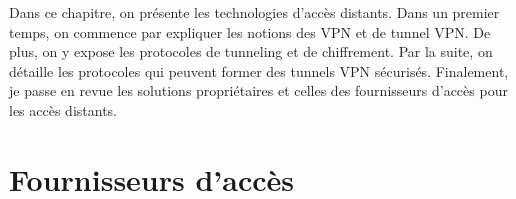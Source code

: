 Dans ce chapitre, on présente les technologies d'accès distants.
Dans un premier temps, on commence par expliquer les notions des VPN et de tunnel VPN. 
De plus, on y expose les protocoles de tunneling et de chiffrement.
Par la suite, on détaille les protocoles qui peuvent former des tunnels VPN sécurisés. 
Finalement, je passe en revue les solutions propriétaires et celles des fournisseurs d'accès pour les accès distants.










\section{Fournisseurs d'accès}



